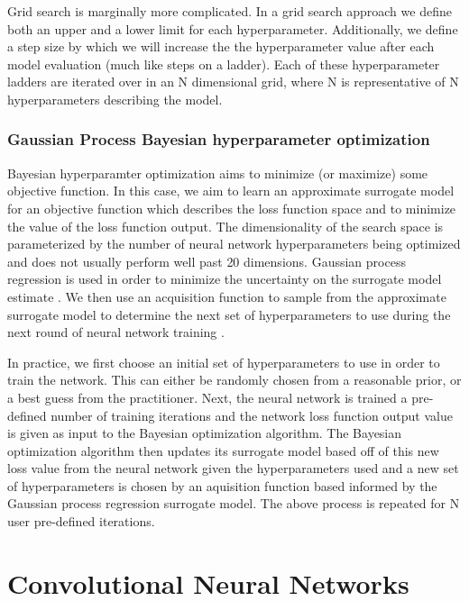 Grid search is marginally more complicated. In a grid 
search approach we define both an upper and a lower limit 
for each hyperparameter. Additionally, we define a step 
size by which we will increase the the hyperparameter 
value after each model evaluation (much like steps 
on a ladder). Each of these hyperparameter 
ladders are iterated over in an N dimensional grid, 
where N is representative of N hyperparameters 
describing the model. 

\subsubsection{Gaussian Process Bayesian hyperparameter optimization}

Bayesian hyperparamter optimization aims to minimize (or maximize) some 
objective function. In this case, we aim to learn an 
approximate surrogate model for an objective function which 
describes the loss function space and to minimize the value of the 
loss function output. The dimensionality of the search space 
is parameterized by the number of neural network hyperparameters being optimized 
and does not usually perform well past 20 dimensions. Gaussian process 
regression is used in order to minimize the uncertainty on the surrogate model estimate 
. We then use an acquisition function to sample from the approximate 
surrogate model to determine the next set of hyperparameters to use 
during the next round of neural network training \cite{1807.02811}.

In practice, we first choose an initial set of hyperparameters 
to use in order to train the network. This can either be randomly chosen 
from a reasonable prior, or a best guess from the practitioner. 
Next, the neural network is trained a pre-defined number of 
training iterations and the network loss function output value 
is given as input to the Bayesian optimization algorithm. The Bayesian 
optimization algorithm then updates its surrogate model 
based off of this new loss value from the neural network 
given the hyperparameters used and a new set of 
hyperparameters is chosen by an aquisition function based 
informed by the Gaussian process regression surrogate model. 
The above process is repeated for N user pre-defined iterations.
%

\section{Convolutional Neural Networks}

